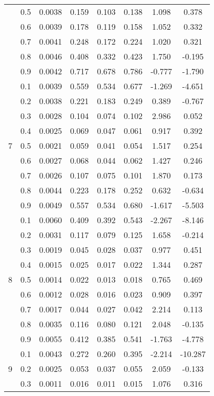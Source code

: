 \documentclass[11pt,a4paper]{report}
\begin{document}
\begin{longtable}{ | c | c || c | c | c | c | c | c | }
 & 0.5 & 0.0038 & 0.159 & 0.103 & 0.138 & 1.098 & 0.378 \\
 & 0.6 & 0.0039 & 0.178 & 0.119 & 0.158 & 1.052 & 0.332 \\
 & 0.7 & 0.0041 & 0.248 & 0.172 & 0.224 & 1.020 & 0.321 \\
 & 0.8 & 0.0046 & 0.408 & 0.332 & 0.423 & 1.750 & -0.195 \\
 & 0.9 & 0.0042 & 0.717 & 0.678 & 0.786 & -0.777 & -1.790 \\
 \hline
\multirow{9}{*}{7} & 0.1 & 0.0039 & 0.559 & 0.534 & 0.677 & -1.269 & -4.651 \\
 & 0.2 & 0.0038 & 0.221 & 0.183 & 0.249 & 0.389 & -0.767 \\
 & 0.3 & 0.0028 & 0.104 & 0.074 & 0.102 & 2.986 & 0.052 \\
 & 0.4 & 0.0025 & 0.069 & 0.047 & 0.061 & 0.917 & 0.392 \\
 & 0.5 & 0.0021 & 0.059 & 0.041 & 0.054 & 1.517 & 0.254 \\
 & 0.6 & 0.0027 & 0.068 & 0.044 & 0.062 & 1.427 & 0.246 \\
 & 0.7 & 0.0026 & 0.107 & 0.075 & 0.101 & 1.870 & 0.173 \\
 & 0.8 & 0.0044 & 0.223 & 0.178 & 0.252 & 0.632 & -0.634 \\
 & 0.9 & 0.0049 & 0.557 & 0.534 & 0.680 & -1.617 & -5.503 \\
 \hline
\multirow{9}{*}{8} & 0.1 & 0.0060 & 0.409 & 0.392 & 0.543 & -2.267 & -8.146 \\
 & 0.2 & 0.0031 & 0.117 & 0.079 & 0.125 & 1.658 & -0.214 \\
 & 0.3 & 0.0019 & 0.045 & 0.028 & 0.037 & 0.977 & 0.451 \\
 & 0.4 & 0.0015 & 0.025 & 0.017 & 0.022 & 1.344 & 0.287 \\
 & 0.5 & 0.0014 & 0.022 & 0.013 & 0.018 & 0.765 & 0.469 \\
 & 0.6 & 0.0012 & 0.028 & 0.016 & 0.023 & 0.909 & 0.397 \\
 & 0.7 & 0.0017 & 0.044 & 0.027 & 0.042 & 2.214 & 0.113 \\
 & 0.8 & 0.0035 & 0.116 & 0.080 & 0.121 & 2.048 & -0.135 \\
 & 0.9 & 0.0055 & 0.412 & 0.385 & 0.541 & -1.763 & -4.778 \\
 \hline
\multirow{9}{*}{9} & 0.1 & 0.0043 & 0.272 & 0.260 & 0.395 & -2.214 & -10.287 \\
 & 0.2 & 0.0025 & 0.053 & 0.037 & 0.055 & 2.059 & -0.133 \\
 & 0.3 & 0.0011 & 0.016 & 0.011 & 0.015 & 1.076 & 0.316 \\

\end{longtable}
\end{document}
